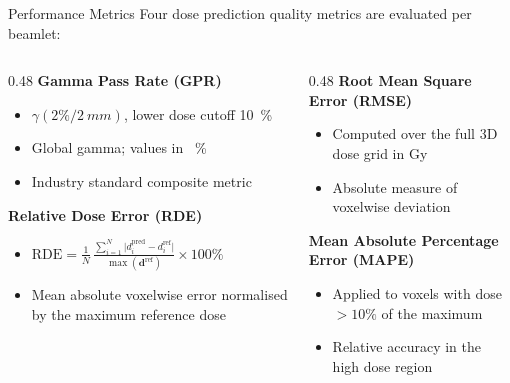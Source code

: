 \documentclass[aspectratio=169, 10pt]{beamer}
\begin{document}
\begin{frame}{Performance Metrics}
  Four dose prediction quality metrics are evaluated per beamlet:

  \vspace{6pt}
  \begin{columns}[T]
    \begin{column}{0.48\textwidth}
      \textbf{Gamma Pass Rate (GPR)}
      \begin{itemize}
        \item $\gamma(2\%/\SI{2}{mm})$, lower dose cutoff \SI{10}{\percent}
        \item Global gamma; values in \SI{}{\percent}
        \item Industry standard composite metric
      \end{itemize}

      \vspace{8pt}
      \textbf{Relative Dose Error (RDE)}
      \begin{itemize}
        \item $\displaystyle \text{RDE} = \frac{1}{N}\,\frac{\sum_{i=1}^{N}\lvert d_i^{\text{pred}} - d_i^{\text{ref}}\rvert}{\max(\mathbf{d}^{\text{ref}})} \times 100\%$
        \item Mean absolute voxelwise error normalised by the maximum reference dose
      \end{itemize}
    \end{column}

    \begin{column}{0.48\textwidth}
      \textbf{Root Mean Square Error (RMSE)}
      \begin{itemize}
        \item Computed over the full 3D dose grid in Gy
        \item Absolute measure of voxelwise deviation
      \end{itemize}

      \vspace{8pt}
      \textbf{Mean Absolute Percentage Error (MAPE)}
      \begin{itemize}
        \item Applied to voxels with dose $> 10\%$ of the maximum
        \item Relative accuracy in the high dose region
      \end{itemize}
    \end{column}
  \end{columns}
\end{frame}
\end{document}
